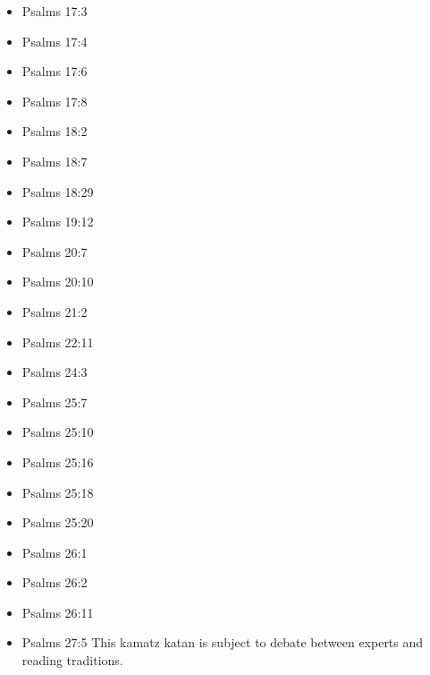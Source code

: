 \documentclass[14pt]{book}
\begin{document}
\begin{multicols}{2}
\begin{itemize}
\item Psalms 17:3

\item Psalms 17:4

\item Psalms 17:6

\item Psalms 17:8

\item Psalms 18:2

\item Psalms 18:7

\item Psalms 18:29

\item Psalms 19:12

\item Psalms 20:7

\item Psalms 20:10

\item Psalms 21:2

\item Psalms 22:11



\item Psalms 24:3

\item Psalms 25:7

\item Psalms 25:10

\item Psalms 25:16

\item Psalms 25:18

\item Psalms 25:20

\item Psalms 26:1

\item Psalms 26:2

\item Psalms 26:11

\item Psalms 27:5 This kamatz katan is subject to debate between experts and reading traditions.


\end{itemize}
\end{multicols}
\end{document}
